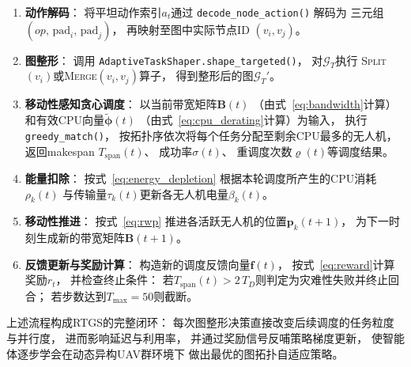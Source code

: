 \begin{enumerate}[label=\textbf{\arabic*.}, leftmargin=*, itemsep=4pt]

  \item \textbf{动作解码}：
        将平坦动作索引$a_t$通过
        \texttt{decode\_node\_action()} 解码为
        三元组$(op,\,\mathrm{pad}_i,\,\mathrm{pad}_j)$，
        再映射至图中实际节点ID $(v_i, v_j)$。

  \item \textbf{图整形}：
        调用 \texttt{AdaptiveTaskShaper.shape\_targeted()}，
        对$\mathcal{G}_T$执行
        \textsc{Split}$(v_i)$或\textsc{Merge}$(v_i, v_j)$算子，
        得到整形后的图$\mathcal{G}_T'$。

  \item \textbf{移动性感知贪心调度}：
        以当前带宽矩阵$\mathbf{B}(t)$
        （由式~\eqref{eq:bandwidth}计算）
        和有效CPU向量$\tilde{\boldsymbol{\phi}}(t)$
        （由式~\eqref{eq:cpu_derating}计算）为输入，
        执行 \texttt{greedy\_match()}，
        按拓扑序依次将每个任务分配至剩余CPU最多的无人机，
        返回makespan $T_{\mathrm{span}}(t)$、
        成功率$\sigma(t)$、
        重调度次数$\varrho(t)$等调度结果。

  \item \textbf{能量扣除}：
        按式~\eqref{eq:energy_depletion}
        根据本轮调度所产生的CPU消耗$\rho_k(t)$
        与传输量$\tau_k(t)$更新各无人机电量$\beta_k(t)$。

  \item \textbf{移动性推进}：
        按式~\eqref{eq:rwp}
        推进各活跃无人机的位置$\mathbf{p}_k(t+1)$，
        为下一时刻生成新的带宽矩阵$\mathbf{B}(t+1)$。

  \item \textbf{反馈更新与奖励计算}：
        构造新的调度反馈向量$\mathbf{f}(t)$，
        按式~\eqref{eq:reward}计算奖励$r_t$，
        并检查终止条件：
        若$T_{\mathrm{span}}(t) > 2\,T_D$则判定为灾难性失败并终止回合；
        若步数达到$T_{\max} = 50$则截断。

\end{enumerate}

上述流程构成RTGS的完整闭环：
每次图整形决策直接改变后续调度的任务粒度与并行度，
进而影响延迟与利用率，
并通过奖励信号反哺策略梯度更新，
使智能体逐步学会在动态异构UAV群环境下
做出最优的图拓扑自适应策略。

